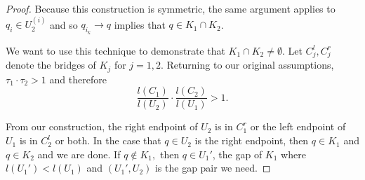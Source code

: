 \begin{proof}
    Because this construction is symmetric, the same argument applies to $q_{i} \in U_2^{(i)}$ and so $q_{i_k} \to q$ implies that $q \in K_1 \cap K_2$.  

    We want to use this technique to demonstrate that $K_1 \cap K_2 \neq \emptyset.$ Let $C_j^l, C_j^r$ denote the bridges of $K_j$ for $j = 1,2$.  Returning to our original assumptions, $\tau_1 \cdot \tau_2 > 1$ and therefore $$\frac{l(C_1)}{l(U_2)} \cdot \frac{l(C_2)}{l(U_1)} > 1.$$  
    
    From our construction, the right endpoint of $U_2$ is in $C_1^r$ or the left endpoint of $U_1$ is in $C_2^l$ or both.  
    In the case that $q \in U_2$ is the right endpoint, then $q \in K_1$ and $q \in K_2$ and we are done.  
    If $q \not\in K_1,$ then $q \in U_1'$, the gap of $K_1$ where $l(U_1') < l(U_1)$ and $(U_1', U_2)$ is the gap pair we need.  

\end{proof}